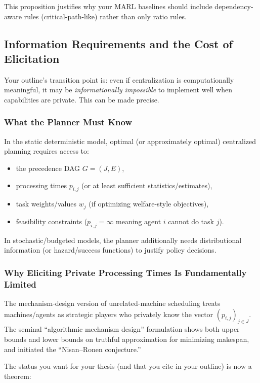 This proposition justifies why your MARL baselines should include dependency-aware rules (critical-path-like) rather than only ratio rules.

\subsection{Information Requirements and the Cost of Elicitation}

Your outline's transition point is: even if centralization is computationally meaningful, it may be \emph{informationally impossible} to implement well when capabilities are private. This can be made precise.

\subsubsection{What the Planner Must Know}

In the static deterministic model, optimal (or approximately optimal) centralized planning requires access to:

\begin{itemize}
\item the precedence DAG \(G=(J,E)\),
\item processing times \(p_{i,j}\) (or at least sufficient statistics/estimates),
\item task weights/values \(w_j\) (if optimizing welfare-style objectives),
\item feasibility constraints (\(p_{i,j}=\infty\) meaning agent \(i\) cannot do task \(j\)).
\end{itemize}

In stochastic/budgeted models, the planner additionally needs distributional information (or hazard/success functions) to justify policy decisions.

\subsubsection{Why Eliciting Private Processing Times Is Fundamentally Limited}

The mechanism-design version of unrelated-machine scheduling treats machines/agents as strategic players who privately know the vector \((p_{i,j})_{j\in J}\). The seminal ``algorithmic mechanism design'' formulation shows both upper bounds and lower bounds on truthful approximation for minimizing makespan, and initiated the ``Nisan--Ronen conjecture.''

The status you want for your thesis (and that you cite in your outline) is now a theorem:

